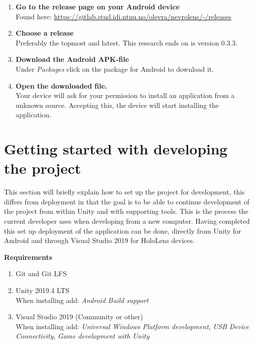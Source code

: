\begin{enumerate}
    \item {
        \textbf{Go to the release page on your Android device}\\
        Found here: \url{https://gitlab.stud.idi.ntnu.no/olevra/nevrolens/-/releases}
    }
    \item {
        \textbf{Choose a release}\\
        Preferably the topmost and latest. This research ends on is version 0.3.3. 
    }

    \item {
        \textbf{Download the Android APK-file}\\
        Under \textit{Packages} click on the package for Android to download it.
    }

    \item {
        \textbf{Open the downloaded file.}\\
        Your device will ask for your permission to install an application from a unknown source. Accepting this, the device will start installing the application.
    }

\end{enumerate}

\section[Project Setup]{Getting started with developing the project}
This section will briefly explain how to set up the project for development, this differs from deployment in that the goal is to be able to continue development of the project from within Unity and with supporting tools. This is the process the current developer uses when developing from a new computer.
Having completed this set up deployment of the application can be done, directly from Unity for Android and through Visual Studio 2019 for HoloLens devices.


\textbf{Requirements}
\begin{enumerate}
    \item Git and Git LFS
    \item { Unity 2019.4 LTS \\
    When installing add: \textit{Android Build support} }
    \item {Visual Studio 2019 (Community or other)\\
    When installing add: \textit{Universal Windows Platform development}, \textit{USB Device Connectivity}, \textit{Game development with Unity} }
\end{enumerate}

